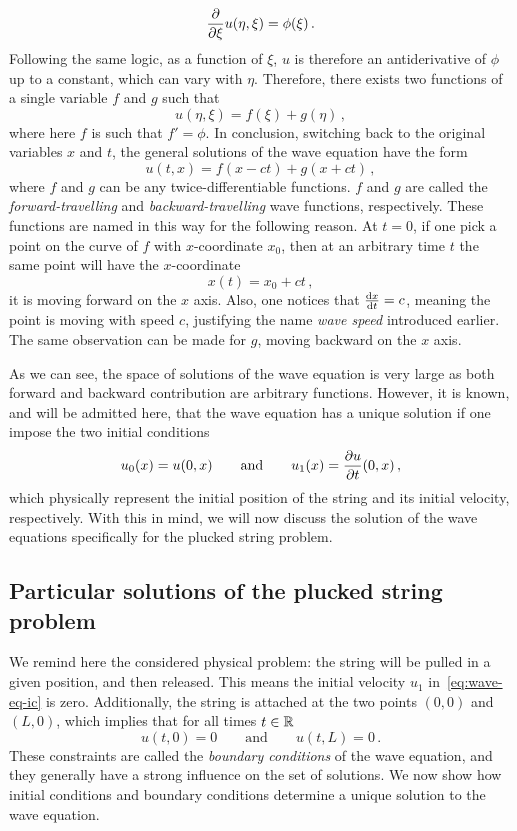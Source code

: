 \begin{equation}
	\frac{\partial }{\partial \xi}u(\eta,\xi)=\phi(\xi)\,.
\end{equation}
Following the same logic, as a function of $\xi$, $u$ is therefore an antiderivative of
$\phi$ up to a constant, which can vary with $\eta$. Therefore, there exists two functions
of a single variable $f$ and $g$ such that
\begin{equation}
	u(\eta,\xi)=f(\xi)+g(\eta)\,,
\end{equation}
where here $f$ is such that $f'=\phi$. In conclusion, switching back to the original
variables $x$ and $t$, the general solutions of the wave equation have the form
\begin{equation}
	\boxed{u(t,x)=f(x-ct)+g(x+ct)\,,}\label{eq:wave-eq-sol}
\end{equation}
where $f$ and $g$ can be any twice-differentiable functions. $f$ and $g$ are called the
\emph{forward-travelling} and \emph{backward-travelling} wave functions, respectively.
These functions are named in this way for the following reason. At $t=0$, if one pick a
point on the curve of $f$ with $x$-coordinate $x_0$, then at an arbitrary time $t$ the
same point will have the $x$-coordinate
\begin{equation}
	x(t)=x_0+ct\,,
\end{equation}
\ie it is moving forward on the $x$ axis. Also, one notices that $\frac{\mathrm{d} x}{\mathrm{d} t}=c$, meaning
the point is moving with speed $c$, justifying the name \emph{wave speed} introduced
earlier. The same observation can be made for $g$, moving backward on the $x$ axis.

As we can see, the space of solutions of the wave equation is very large as both forward
and backward contribution are arbitrary functions. However, it is known, and will be
admitted here, that the wave equation has a unique solution if one impose the two initial
conditions
\begin{equation}
	u_0(x)=u(0,x)\qquad\text{and}\qquad u_1(x)=\frac{\partial u}{\partial t}(0,x)\,,\label{eq:wave-eq-ic}
\end{equation}
which physically represent the initial position of the string and its initial velocity,
respectively. With this in mind, we will now discuss the solution of the wave equations
specifically for the plucked string problem.
%
\subsection{Particular solutions of the plucked string problem}
We remind here the considered physical problem: the string will be pulled in a given
position, and then released. This means the initial velocity $u_1$
in~\cref{eq:wave-eq-ic} is zero. Additionally, the string is attached at the two points
$(0,0)$ and $(L,0)$, which implies that for all times $t\in\mathbb{R}$
\begin{equation}
	u(t,0)=0\qquad\text{and}\qquad u(t,L)=0\,.\label{eq:string-bc}
\end{equation}
These constraints are called the \emph{boundary conditions} of the wave equation, and they
generally have a strong influence on the set of solutions. We now show how initial
conditions and boundary conditions determine a unique solution to the wave equation.

